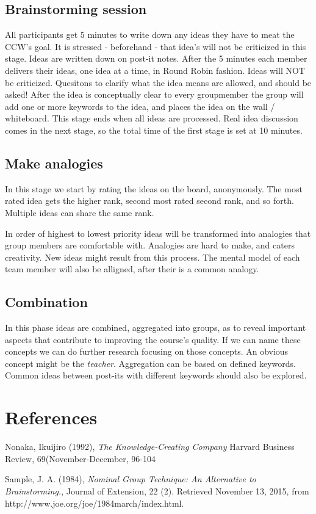 \section{Brainstorming session}
All participants get 5 minutes to write down any ideas they have to meat the CCW's goal. It is stressed - beforehand - that idea's will not be criticized in this stage. Ideas are written down on post-it notes. After the 5 minutes each member delivers their ideas, one idea at a time, in Round Robin fashion. Ideas will NOT be criticized. Quesitons to clarify what the idea means are allowed, and should be asked! After the idea is conceptually clear to every groupmember the group will add one or more keywords to the idea, and places the idea on the wall / whiteboard. This stage ends when all ideas are processed. Real idea discussion comes in the next stage, so the total time of the first stage is set at 10 minutes.

\section{Make analogies}
In this stage we start by rating the ideas on the board, anonymously. The most rated idea gets the higher rank, second most rated second rank, and so forth. Multiple ideas can share the same rank. 

In order of highest to lowest priority ideas will be transformed into analogies that group members are comfortable with. Analogies are hard to make, and caters creativity. New ideas might result from this process. The mental model of each team member will also be alligned, after their is a common analogy.    

\section{Combination}
In this phase ideas are combined, aggregated into groups, as to reveal important aspects that contribute to improving the course's quality. If we can name these concepts we can do further research focusing on those concepts. An obvious concept might be the \textit{teacher}. Aggregation can be based on defined keywords. Common ideas between post-its with different keywords should also be explored.

\chapter{References}

\begin{thebibliography}{9}
	
	Nonaka, Ikuijiro (1992),
	\textit{The Knowledge-Creating Company}
	Harvard Business Review, 69(November-December, 96-104
	
	Sample, J. A. (1984),
	\textit{Nominal Group Technique: An Alternative to Brainstorming.},
	Journal of Extension, 22 (2). Retrieved November 13,
	2015, from http://www.joe.org/joe/1984march/index.html.
	
	
	
\end{thebibliography}


\appendix



